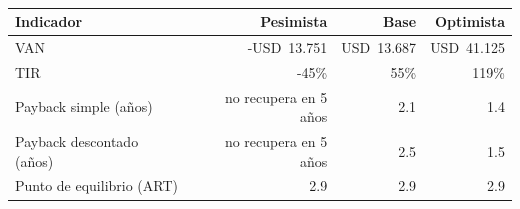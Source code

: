 \begin{table}[htbp]
\centering
\caption[Indicadores de viabilidad por escenario (USD)]{ \fuentepropia}
\label{tab:negocio-indicadores}
\small
\begin{tabular}{lrrr}
\hline
\textbf{Indicador} & \textbf{Pesimista} & \textbf{Base} & \textbf{Optimista} \\
\hline
VAN & -USD~13.751 & USD~13.687 & USD~41.125 \\
TIR & -45\% & 55\% & 119\% \\
Payback simple (a\~nos) & no recupera en 5 a\~nos & 2.1 & 1.4 \\
Payback descontado (a\~nos) & no recupera en 5 a\~nos & 2.5 & 1.5 \\
Punto de equilibrio (ART) & 2.9 & 2.9 & 2.9 \\
\hline
\end{tabular}
\end{table}
